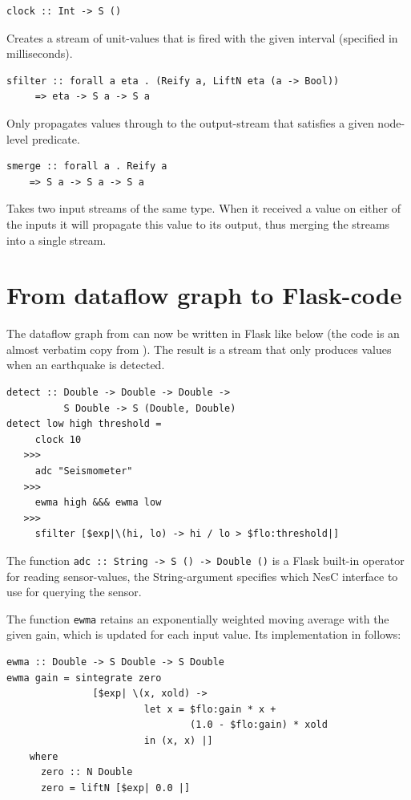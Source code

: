 \documentclass[a4paper, oneside, final]{memoir}
\let\fref\undefined
\begin{document}
\begin{description}
\item
\begin{verbatim}
clock :: Int -> S ()
\end{verbatim}
  Creates a stream of unit-values
  that is fired with the given interval (specified in milliseconds).

\item
\begin{verbatim}
sfilter :: forall a eta . (Reify a, LiftN eta (a -> Bool))
     => eta -> S a -> S a
\end{verbatim}
  Only propagates values through to the
  output-stream that satisfies a given node-level predicate.
  
\item
\begin{verbatim}
smerge :: forall a . Reify a
    => S a -> S a -> S a
\end{verbatim}
Takes two input streams of the same type. When it received a value on
either of the inputs it will propagate this value to its output, thus
merging the streams into a single stream.

\end{description}
\newpage
\section{From dataflow graph to Flask-code}
The dataflow graph from \fref{fig:ewma-example} can now be written
in Flask like below (the code is an almost verbatim copy from
\cite{flask08}). The result is a stream that only produces values when
an earthquake is detected.
\begin{verbatim}
detect :: Double -> Double -> Double -> 
          S Double -> S (Double, Double)
detect low high threshold = 
     clock 10
   >>>
     adc "Seismometer"
   >>>
     ewma high &&& ewma low
   >>>
     sfilter [$exp|\(hi, lo) -> hi / lo > $flo:threshold|]
\end{verbatim}

\noindent
The function \texttt{adc :: String -> S () -> Double ()} is a Flask
built-in operator for reading sensor-values, the String-argument
specifies which NesC interface to use for querying the sensor.

The function \texttt{ewma} retains an exponentially weighted moving
average with the given gain, which is updated for each input
value. Its implementation in \cite{flask08} follows:

\begin{verbatim}
ewma :: Double -> S Double -> S Double
ewma gain = sintegrate zero
               [$exp| \(x, xold) ->
                        let x = $flo:gain * x +
                                (1.0 - $flo:gain) * xold
                        in (x, x) |]
    where
      zero :: N Double
      zero = liftN [$exp| 0.0 |]
\end{verbatim}
\end{document}
